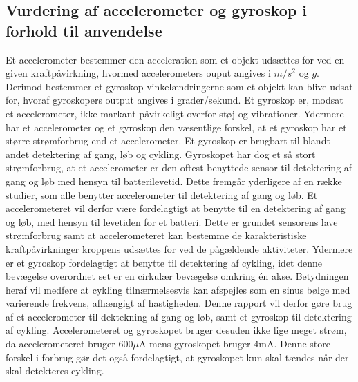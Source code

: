 \subsection{Vurdering af accelerometer og gyroskop i forhold til anvendelse}\label{acc_og_gyro}
Et accelerometer bestemmer den acceleration som et objekt udsættes for ved en given kraftpåvirkning, hvormed accelerometers ouput angives i $m/s^2$ og $g$. Derimod bestemmer et gyroskop vinkelændringerne som et objekt kan blive udsat for, hvoraf gyroskopers output angives i grader/sekund. Et gyroskop er, modsat et accelerometer, ikke markant påvirkeligt overfor støj og vibrationer. \citep{Goodrich2013,TittertonWeston2004,LuingeVeltink2005} \newline
Ydermere har et accelerometer og et gyroskop den væsentlige forskel, at et gyroskop har et større strømforbrug end et accelerometer.  Et gyroskop er brugbart til blandt andet detektering af gang, løb og cykling. Gyroskopet har dog et så stort strømforbrug, at et accelerometer er den oftest benyttede sensor til detektering af gang og løb med hensyn til batterilevetid. Dette fremgår yderligere af en række studier, som alle benytter accelerometer til detektering af gang og løb. \citep{Rueterbories2010,Sparkfun,ClelandKikhia2013} \newline
Et accelerometeret vil derfor være fordelagtigt at benytte til en detektering af gang og løb, med hensyn til levetiden for et batteri. Dette er grundet sensorens lave strømforbrug samt at accelerometeret kan bestemme de karakteristiske kraftpåvirkninger kroppens udsættes for ved de pågældende aktiviteter. Ydermere er et gyroskop fordelagtigt at benytte til detektering af cykling, idet denne bevægelse overordnet set er en cirkulær bevægelse omkring én akse. Betydningen heraf vil medføre at cykling tilnærmelsesvis kan afspejles som en sinus bølge med varierende frekvens, afhængigt af hastigheden. \newline
Denne rapport vil derfor gøre brug af et accelerometer til dektekning af gang og løb, samt et gyroskop til detektering af cykling. Accelerometeret og gyroskopet bruger desuden ikke lige meget strøm, da accelerometeret bruger 600$\mu$A mens gyroskopet bruger 4mA. Denne store forskel i forbrug gør det også fordelagtigt, at gyroskopet kun skal tændes når der skal detekteres cykling.